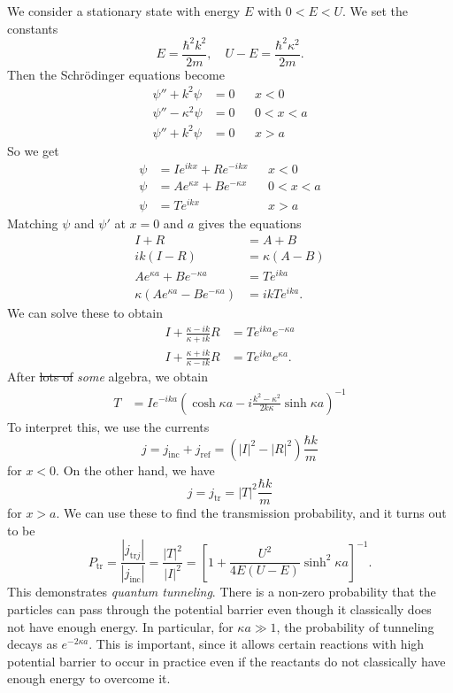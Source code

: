 \documentclass[a4paper]{article}
\begin{document}
We consider a stationary state with energy $E$ with $0 < E < U$. We set the constants
\[
E = \frac{\hbar^2 k^2}{2m},\quad U - E = \frac{\hbar^2\kappa^2}{2m}.
\]
Then the Schr\"odinger equations become
\begin{align*}
\psi'' + k^2 \psi &= 0 && x < 0\\
\psi'' - \kappa^2 \psi &= 0 && 0 < x < a\\
\psi'' + k^2 \psi &= 0 && x > a
\end{align*}
So we get
\begin{align*}
\psi &= I e^{ikx} + Re^{-ikx}&& x < 0\\
\psi &= Ae^{\kappa x} + Be^{-\kappa x}&& 0 < x < a\\
\psi &= Te^{ikx} && x > a
\end{align*}
Matching $\psi$ and $\psi'$ at $x = 0$ and $a$ gives the equations
\begin{align*}
I + R &= A + B\\
ik(I - R) &= \kappa (A - B)\\
A e^{\kappa a} + Be^{-\kappa a} &= Te^{ika}\\
\kappa(Ae^{\kappa a} - Be^{-\kappa a}) &= ik Te^{ika}.
\end{align*}
We can solve these to obtain
\begin{align*}
I + \frac{\kappa - ik}{\kappa + ik}R &= Te^{ika} e^{-\kappa a}\\
I + \frac{\kappa + ik}{\kappa - ik}R &= Te^{ika} e^{\kappa a}.
\end{align*}
After \st{lots of} \emph{some} algebra, we obtain
\begin{align*}
T &= I e^{-ika}\left(\cosh \kappa a - i\frac{k^2 - \kappa^2}{2k\kappa} \sinh \kappa a\right)^{-1}
\end{align*}
To interpret this, we use the currents
\[
j = j_{\mathrm{inc}} + j_{\mathrm{ref}} = (|I|^2 - |R|^2) \frac{\hbar k}{m}
\]
for $x < 0$. On the other hand, we have
\[
j = j_{\mathrm{tr}} = |T|^2 \frac{\hbar k}{m}
\]
for $x > a$. We can use these to find the transmission probability, and it turns out to be
\[
P_{\mathrm{tr}} = \frac{|j_{\mathrm{tr}j}|}{|j_{\mathrm{inc}}|} = \frac{|T|^2}{|I|^2} = \left[1 + \frac{U^2}{4E(U - E)} \sinh^2 \kappa a\right]^{-1}.
\]
This demonstrates \emph{quantum tunneling}. There is a non-zero probability that the particles can pass through the potential barrier even though it classically does not have enough energy. In particular, for $\kappa a \gg 1$, the probability of tunneling decays as $e^{-2\kappa a}$. This is important, since it allows certain reactions with high potential barrier to occur in practice even if the reactants do not classically have enough 
energy to overcome it.
\end{document}
